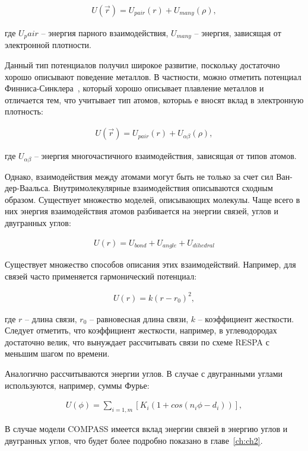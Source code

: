 \begin{align}
	U(\overrightarrow{r}) = U_{pair}(r) + U_{many}(\rho),
\end{align}

где $U_pair$ \--- энергия парного взаимодействия, $U_{many}$ \--- энергия, зависящая от электронной плотности.

Данный тип потенциалов получил широкое развитие, поскольку достаточно хорошо описывают поведение металлов. В частности, можно отметить потенциал Финниса-Синклера~\cite{ackland_computer_1997}, который хорошо описывает плавление металлов и отличается тем, что учитывает тип атомов, которыь е вносят вклад в электронную плотность:

\begin{align}
	U(\overrightarrow{r}) = U_{pair}(r) + U_{\alpha \beta}(\rho),
\end{align}

где $U_{\alpha \beta}$ \--- энергия многочастичного взаимодействия, зависящая от типов атомов.


Однако, взаимодействия между атомами могут быть не только за счет сил Ван-дер-Ваальса. Внутримолекулярные взаимодействия описываются сходным образом. Существует множество моделей, описывающих молекулы. Чаще всего в них энергия взаимодействия  атомов разбивается на энергии связей, углов и двугранных углов:

\begin{align}
	U(r) = U_{bond} + U_{angle} + U_{dihedral}
\end{align}

Существует множество способов описания этих взаимодействий. Например, для связей часто применяется гармонический потенциал:

\begin{align}
	U(r) = k (r - r_0)^2,
\end{align}

где $r$ \--- длина связи, $r_0$ \--- равновесная длина связи, $k$ \--- коэффициент жесткости. Следует отметить, что коэффициент жесткости, например, в углеводородах достаточно велик, что вынуждает рассчитывать связи по схеме RESPA с меньшим шагом по времени.

Аналогично рассчитываются энергии углов. В случае с двугранными углами используются, например, суммы Фурье:

\begin{align}
	U(\phi) = \sum_{i=1, m}[K_i(1+cos(n_i\phi - d_i))],
\end{align}

В случае модели COMPASS имеется вклад энергии связей в энергию углов и двугранных углов, что будет более подробно показано в главе~\cref{ch:ch2}.

